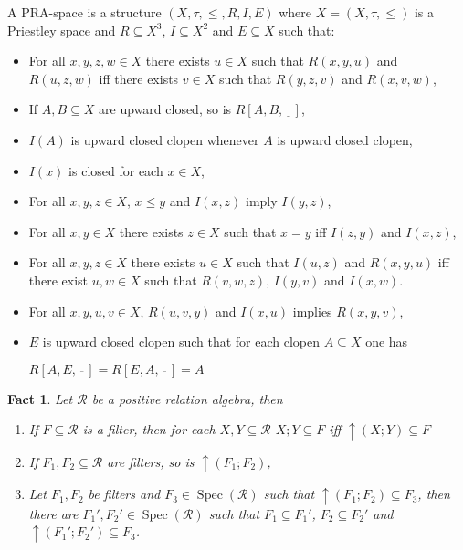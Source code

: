 \documentclass[a4paper]{article}
\theoremstyle{defin}
\theoremstyle{theorem}
\theoremstyle{claim}
\theoremstyle{prop}
\theoremstyle{lemma}
\theoremstyle{fact}
\newtheorem{fact}{Fact}
\theoremstyle{ex}
\theoremstyle{col}
\begin{document}
A PRA-space is a structure $(X, \tau, \leq, R, I, E)$ where $X = (X, \tau, \leq)$ is a Priestley space and $R \subseteq X^3$, $I \subseteq X^2$ and $E \subseteq X$ such that:
\begin{itemize}
\item For all $x, y, z, w \in X$ there exists $u \in X$ such that $R(x, y, u)$ and $R(u, z, w)$ iff there exists $v \in X$ such that $R(y,z,v)$ and $R(x, v, w)$,
\item If $A, B \subseteq X$ are upward closed, so is $R[A, B, \underline{\:\:\:}]$,
\item $I(A)$ is upward closed clopen whenever $A$ is upward closed clopen,
\item $I(x)$ is closed for each $x \in X$,
\item For all $x, y, z \in X$, $x \leq y$ and $I(x, z)$ imply $I(y, z)$,
\item For all $x, y \in X$ there exists $z \in X$ such that $x = y$ iff $I(z, y)$ and $I(x, z)$,
\item For all $x, y, z \in X$ there exists $u \in X$ such that $I(u, z)$ and $R(x, y, u)$ iff there exist $u, w \in X$ such that $R(v, w, z)$, $I(y,v)$ and $I(x, w)$.
\item For all $x,y,u, v \in X$, $R(u,v,y)$ and $I(x, u)$ implies $R(x,y,v)$,
\item $E$ is upward closed clopen such that for each clopen $A \subseteq X$ one has
\begin{center}
$R[A, E, \overline{\:\:\:}] = R[E, A, \overline{\:\:\:}] = A$
\end{center}
\end{itemize}

\begin{fact} Let $\mathcal{R}$ be a positive relation algebra, then

\begin{enumerate}
\item If $F \subseteq \mathcal{R}$ is a filter, then for each $X, Y \subseteq \mathcal{R}$ $X ; Y \subseteq F$ iff $\uparrow (X ; Y) \subseteq F$
\item If $F_1, F_2 \subseteq \mathcal{R}$ are filters, so is $\uparrow (F_1 ; F_2)$,
\item Let $F_1, F_2$ be filters and $F_3 \in \operatorname{Spec}(\mathcal{R})$ such that $\uparrow (F_1 ; F_2) \subseteq F_3$, then there are $F_1', F_2' \in \operatorname{Spec}(\mathcal{R})$ such that $F_1 \subseteq F_1'$, $F_2 \subseteq F_2'$ and $\uparrow (F_1' ; F_2') \subseteq F_3$.
\end{enumerate}

\end{fact}
\end{document}
